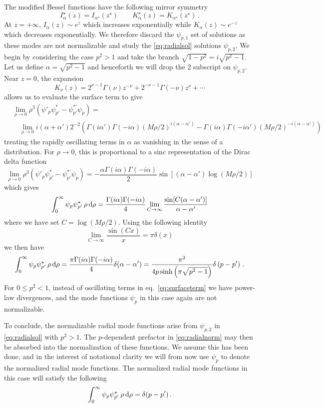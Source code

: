 \documentclass{brownthesis}
\def\dd{{\rm d}}
\begin{document}
The modified Bessel functions have the following mirror symmetry
\[
I_{\alpha}^{\star}(z)=I_{\alpha^{\star}}(z^{\star})\qquad K_{\alpha}^{\star}(z)=K_{\alpha^{\star}}(z^{\star})\,.
\]
At $z=+\infty$, $I_{\alpha}(z)\sim e^{z}$ which increases exponentially
while $K_{\alpha}(z)\sim e^{-z}$ which decreases exponentially. We
therefore discard the $\psi_{p,1}$ set of solutions as these modes
are not normalizable and study the \eqref{eq:radialsol} solutions
$\psi_{p,2}$. We begin by considering the case $p^{2}>1$ and take
the branch $\sqrt{1-p^{2}}=i\sqrt{p^{2}-1}$. Let us define $\alpha=\sqrt{p^{2}-1}$
and henceforth we will drop the 2 subscript on $\psi_{p,2}$. Near
$z=0$, the expansion
\[
K_{\nu}(z)=2^{\nu-1}\Gamma(\nu)z^{-\nu}+2^{-\nu-1}\Gamma(-\nu)z^{\nu}+\cdots
\]
allows us to evaluate the surface term to give
\begin{align}
 & \lim_{\rho\to0}\rho^{3}\left(\psi'_{p}\psi_{p'}^{*}-\psi_{p'}^{*'}\psi_{p}\right)=\nonumber \\
 & \quad\lim_{\rho\to0}i(\alpha+\alpha')2^{-2}\left(\Gamma(i\alpha')\Gamma(-i\alpha)(M\rho/2)^{i(\alpha-\alpha')}-\Gamma(i\alpha)\Gamma(-i\alpha')(M\rho/2)^{-i(\alpha-\alpha')}\right)\label{eq:surfaceterm}
\end{align}
treating the rapidly oscillating terms in $\alpha$ as vanishing in
the sense of a distribution. For $\rho\to0$, this is proportional
to a sinc representation of the Dirac delta function
\[
\lim_{\rho\to0}\rho^{3}\left(\psi'_{p}\psi_{p'}^{*}-\psi_{p'}^{*'}\psi_{p}\right)=-\frac{\alpha\Gamma(i\alpha)\Gamma(-i\alpha)}{2}\sin\left[(\alpha-\alpha')\log(M\rho/2)\right]
\]
which gives
\[
\int_{0}^{\infty}\psi_{p}\psi_{p'}^{\star}\,\rho\,\dd\rho=\frac{\Gamma(i\alpha)\Gamma(-i\alpha)}{4}\lim_{C\to\infty}\frac{\sin[C(\alpha-\alpha')]}{\alpha-\alpha'}
\]
where we have set $C=\log(M\rho/2)$. Using the following identity
\[
\lim_{C\to\infty}\frac{\sin(Cx)}{x}=\pi\delta(x)
\]
we then have
\begin{equation}
\int_{0}^{\infty}\psi_{p}\psi_{p'}^{\star}\,\rho\,\dd\rho=\frac{\pi\Gamma(i\alpha)\Gamma(-i\alpha)}{4}\delta(\alpha-\alpha')=\frac{\pi^{2}}{4p\sinh\left(\pi\sqrt{p^{2}-1}\right)}\delta\left(p-p'\right)\,.\label{eq:radialnorm}
\end{equation}
 For $0\le p^{2}<1$, instead of oscillating terms in eq.~\ref{eq:surfaceterm}
we have power-law divergences, and the mode functions $\psi_{p}$
in this case again are not normalizable.

To conclude, the normalizable radial mode functions arise from $\psi_{p,2}$
in \eqref{eq:radialsol} with $p^{2}>1$. The $p$-dependent prefactor
in \eqref{eq:radialnorm} may then be absorbed into the normalization
of these functions. We assume this has been done, and in the interest
of notational clarity we will from now use $\psi_{p}$ to denote the
normalized radial mode functions. The normalized radial mode functions
in this case will satisfy the following
\begin{equation}
\int_{0}^{\infty}\psi_{p}\psi_{p'}^{\star}\,\rho\,\dd\rho=\delta(p-p')\,.\label{eq:radialinnerprod}
\end{equation}
\end{document}
